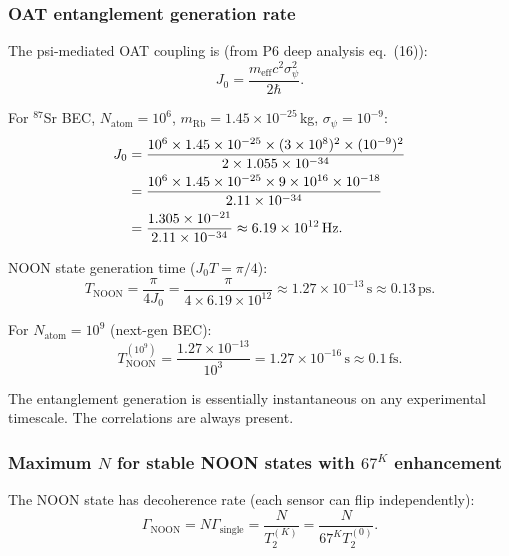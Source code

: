 \documentclass[11pt]{article}
\theoremstyle{definition}
\theoremstyle{remark}
\begin{document}
\subsubsection{OAT entanglement generation rate}

The psi-mediated OAT coupling is (from P6 deep analysis eq.~(16)):
\begin{equation}
J_0 = \frac{m_{\mathrm{eff}} c^2 \sigma_\psi^2}{2\hbar}.
\end{equation}

For $^{87}$Sr BEC, $N_{\mathrm{atom}} = 10^6$, $m_{\mathrm{Rb}} = 1.45\times10^{-25}$\,kg,
$\sigma_\psi = 10^{-9}$:
\begin{align}
J_0 &= \frac{10^6 \times 1.45\times10^{-25} \times (3\times10^8)^2 \times (10^{-9})^2}
{2 \times 1.055\times10^{-34}} \notag \\
&= \frac{10^6 \times 1.45\times10^{-25} \times 9\times10^{16} \times 10^{-18}}
{2.11\times10^{-34}} \notag \\
&= \frac{1.305\times10^{-21}}{2.11\times10^{-34}}
\approx 6.19\times10^{12}\,\mathrm{Hz}.
\end{align}

NOON state generation time ($J_0 T = \pi/4$):
\begin{equation}
\boxed{T_{\mathrm{NOON}} = \frac{\pi}{4 J_0}
= \frac{\pi}{4 \times 6.19\times10^{12}}
\approx 1.27\times10^{-13}\,\mathrm{s} \approx 0.13\,\mathrm{ps}.}
\label{eq:noon-gen-time}
\end{equation}

For $N_{\mathrm{atom}} = 10^9$ (next-gen BEC):
\begin{equation}
T_{\mathrm{NOON}}^{(10^9)} = \frac{1.27\times10^{-13}}{10^3}
= 1.27\times10^{-16}\,\mathrm{s} \approx 0.1\,\mathrm{fs}.
\end{equation}

The entanglement generation is essentially instantaneous on any
experimental timescale. The correlations are always present.

\subsubsection{Maximum $N$ for stable NOON states with $67^K$ enhancement}

The NOON state has decoherence rate (each sensor can flip independently):
\begin{equation}
\Gamma_{\mathrm{NOON}} = N \Gamma_{\mathrm{single}}
= \frac{N}{T_2^{(K)}}
= \frac{N}{67^K T_2^{(0)}}.
\end{equation}
\end{document}
